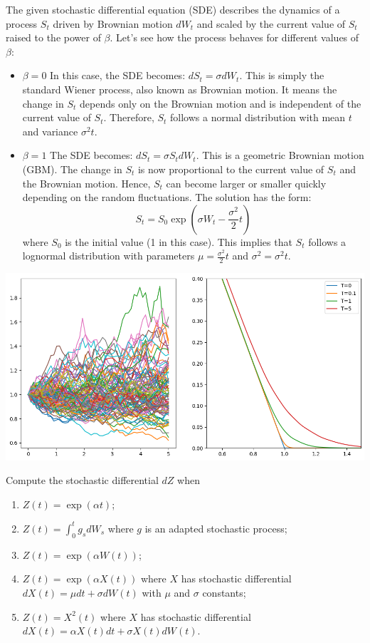 \documentclass[12pt,a4paper]{exam}
\begin{document}
\begin{questions}
\begin{solution}
The given stochastic differential equation (SDE) describes the dynamics of a process $S_t$ driven by Brownian motion $dW_t$ and scaled by the current value of $S_t$ raised to the power of $\beta$. Let's see how the process behaves for different values of $\beta$:
\begin{itemize}
\item \textbf{$\beta=0$} In this case, the SDE becomes: $dS_t = \sigma dW_t$. This is simply the standard Wiener process, also known as Brownian motion. It means the change in $S_t$ depends only on the Brownian motion and is independent of the current value of $S_t$. Therefore, $S_t$ follows a normal distribution with mean $t$ and variance $\sigma^2 t$.
\item \textbf{$\beta=1$} The SDE becomes: $dS_t = \sigma S_t dW_t$. This is a geometric Brownian motion (GBM). The change in $S_t$ is now proportional to the current value of $S_t$ and the Brownian motion. Hence, $S_t$ can become larger or smaller quickly depending on the random fluctuations. The solution has the form:
\begin{equation*}
S_t = S_0 \exp\left(\sigma W_t - \frac{\sigma^2}{2}t\right) 
\end{equation*}
where $S_0$ is the initial value (1 in this case). This implies that $S_t$ follows a lognormal distribution with parameters $\mu=\frac{\sigma^2}{2}t$ and $\sigma^2 = \sigma^2 t$.
\end{itemize}
\begin{center}
	\includegraphics[width=0.8\linewidth]{addons/cev_sim}
\end{center}
\end{solution}

\question Compute the stochastic differential $dZ$ when
\begin{enumerate}[label=(\alph*),font=\itshape]
\item $Z(t) = \exp(\alpha t)$;
\item $Z(t) = \int_0^t g_s dW_s$ where $g$ is an adapted stochastic process;
\item $Z(t) = \exp(\alpha W(t))$;
\item $Z(t) = \exp(\alpha X(t))$ where $X$ has stochastic differential $dX(t)=\mu dt + \sigma dW(t)$ with $\mu$ and $\sigma$ constants;
\item $Z(t) = X^2(t)$ where $X$ has stochastic differential $dX(t)=\alpha X(t)dt + \sigma X(t)dW(t)$.
\end{enumerate}
\fillwithlines{3cm}


\end{questions}
\end{document}

